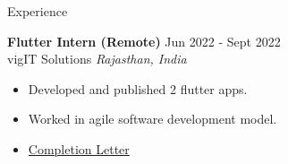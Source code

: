 \documentclass{resume}
\begin{document}
\begin{rSection}{Experience}
\vspace{-1em}
\item \textbf{Flutter Intern (Remote)} \hfill Jun 2022 - Sept 2022\\
vigIT Solutions \hfill \textit{Rajasthan, India}
 \begin{itemize}
    \itemsep -3pt {} 
    \item Developed and published 2 flutter apps.
    \item Worked in agile software development model.
    \item \href{https://github.com/JayNakum/JayNakum.github.io/blob/main/assets/Documents/vigIT_internship.pdf}{Completion Letter}
 \end{itemize}
\end{rSection} 
\end{document}
